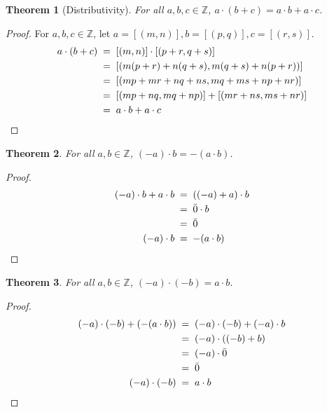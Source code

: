 \documentclass[10pt]{article}
\newtheorem{theorem}{Theorem}[section]
\theoremstyle{definition}
\theoremstyle{remark}
\newcommand{\Z}{\mathbb{Z}}
\begin{document}
        \begin{theorem}[Distributivity]
                For all $a,b,c \in \Z$, $a\cdot(b + c) = a\cdot b + a\cdot c$.
        \end{theorem}
        \begin{proof}
                For $a,b,c \in \Z$, let $a = [(m, n)], b = [(p, q)], c = [(r, s)]$.
                \begin{align*}
                        a\cdot (b + c) \;&=\; [(m, n)] \cdot [(p + r, q + s)] \\
                                \;&=\; [(m(p + r) + n(q + s), m(q + s) + n(p + r))] \\
                                \;&=\; [(mp + mr + nq + ns, mq + ms + np + nr)] \\
                                \;&=\; [(mp + nq, mq + np)] + [(mr + ns, ms + nr)] \\
                                \;&=\; a\cdot b + a\cdot c \qedhere
                \end{align*}
        \end{proof}
        \begin{theorem}
                For all $a, b \in \Z$, $(-a)\cdot b = -(a\cdot b)$.
        \end{theorem}
        \begin{proof}
                \begin{align*}
                        (-a)\cdot b + a\cdot b \;&=\; ((-a) + a)\cdot b \\
                                \;&=\; \bar{0} \cdot b \\
                                \;&=\; \bar{0}\\
                        (-a)\cdot b \;&=\; -(a\cdot b) \qedhere
                \end{align*}
        \end{proof}
        \begin{theorem}
                For all $a, b \in \Z$, $(-a)\cdot(-b) = a\cdot b$.
        \end{theorem}
        \begin{proof}
                \begin{align*}
                        (-a)\cdot(-b) + (-(a\cdot b)) \;&=\; (-a)\cdot(-b) + (-a)\cdot b\\
                                \;&=\; (-a)\cdot((-b) + b) \\
                                \;&=\; (-a)\cdot \bar{0} \\
                                \;&=\; \bar{0}\\
                        (-a)\cdot(-b) \;&=\; a\cdot b \qedhere
                \end{align*}
        \end{proof}
\end{document}
